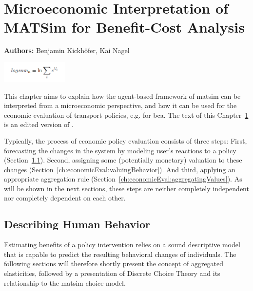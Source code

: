 \chapter{Microeconomic Interpretation of MATSim for Benefit-Cost Analysis}
\label{ch:economicEval}

\hfill \textbf{Authors:} Benjamin Kickhöfer, Kai Nagel

\begin{center} \includegraphics[width=0.25\textwidth, angle=0]{understanding/figures/logsum} \end{center}


This chapter aims to explain how the agent-based framework of \acrshort{matsim} can be interpreted from a microeconomic perspective, and how it can be used for the economic evaluation of transport policies, e.g. for \gls{bca}. The text of this Chapter~\ref{ch:economicEval} is an edited version of \citet[][Section~2.3]{Kickhoefer2014PhD}.

Typically, the process of economic policy evaluation consists of three steps:
%
First, forecasting the changes in the system by modeling user's reactions to a policy (Section~\ref{ch:economicEval:describingBehavior}).
%
Second, assigning some (potentially monetary) valuation to these changes (Section~\ref{ch:economicEval:valuingBehavior}).
%
And third, applying an appropriate aggregation rule (Section~\ref{ch:economicEval:aggregatingValues}).
%
As will be shown in the next sections, these steps are neither completely independent nor completely dependent on each other.

\section{Describing Human Behavior}
\label{ch:economicEval:describingBehavior}
Estimating benefits of a policy intervention relies on a sound descriptive model that is capable to predict the resulting behavioral changes of individuals. The following sections will therefore shortly present the concept of aggregated elasticities, followed by a presentation of Discrete Choice Theory and its relationship to the \acrshort{matsim} choice model.

